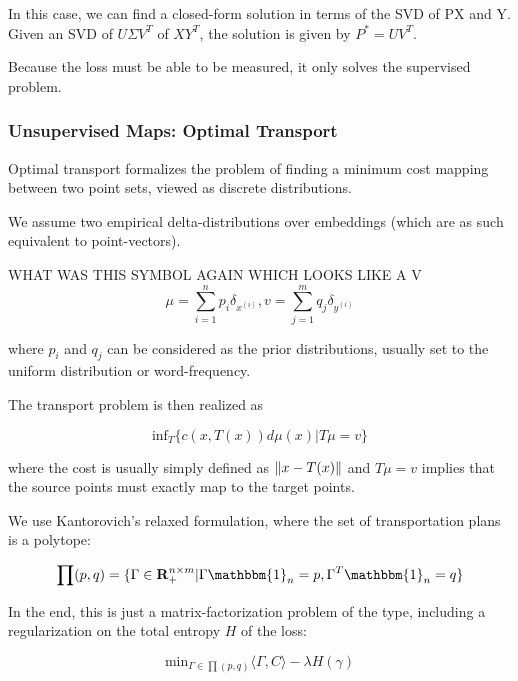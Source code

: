 \documentclass[a4paper,12pt,twoside,openright]{report}
\begin{document}
In this case, we can find a closed-form solution in terms of the SVD of PX and Y.
Given an SVD of $U \Sigma V^T$ of $XY^T$, the solution is given by $P^* = UV^T$.

Because the loss must be able to be measured, it only solves the supervised problem.


\subsubsection{Unsupervised Maps: Optimal Transport}

Optimal transport formalizes the problem of finding a minimum cost mapping between two point sets, viewed as discrete distributions.

We assume two empirical delta-distributions over embeddings (which are as such equivalent to point-vectors).

WHAT WAS THIS SYMBOL AGAIN WHICH LOOKS LIKE A V
\begin{equation}
\mu = \sum_{i=1}^n p_i \delta_{x^(i)}, v = \sum_{j=1}^m q_j \delta_{y^(i)}
\end{equation}

where $p_i$ and $q_j$ can be considered as the prior distributions, usually set to the uniform distribution or word-frequency.

The transport problem is then realized as 

\begin{equation}
\text{inf}_T  \lbrace c(x, T(x)) d \mu(x) | T \mu = v \rbrace
\end{equation}

where the cost is usually simply defined as $\left\lVert x - T(x)\right\rVert$ and $T \mu = v$ implies that the source points must exactly map to the target points.

We use Kantorovich's relaxed formulation, where the set of transportation plans is a polytope:

\begin{equation}
\prod(p, q) = \lbrace \Gamma \in \mathbf{R}_+^{n \times m} | \Gamma \mathbbm{1}_n = p, \Gamma^T \mathbbm{1}_n = q \rbrace
\end{equation}

In the end, this is just a matrix-factorization problem of the type, including a regularization on the total entropy $H$ of the loss:

\begin{equation}
\text{min}_{\Gamma \in \prod(p, q)} \langle \Gamma, C \rangle - \lambda H(\gamma)
\end{equation}
\end{document}
